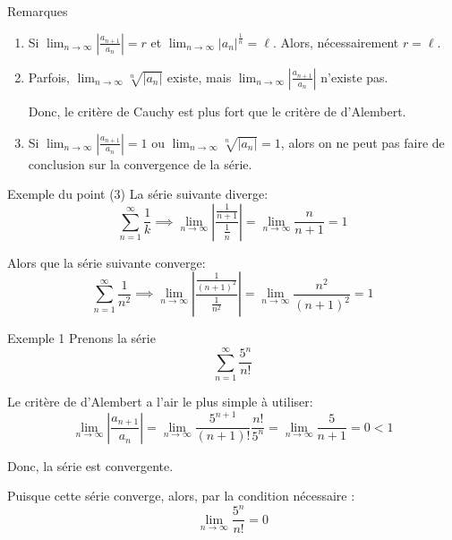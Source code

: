 \documentclass[a4paper]{article}
\begin{document}
\begin{parag}{Remarques}
    \begin{enumerate}[left=0pt]
        \item Si $\lim_{n \to \infty} \left|\frac{a_{n+1}}{a_n}\right| = r$ et $\lim_{n \to \infty} \left|a_n\right|^{\frac{1}{n}} = \ell$. Alors, nécessairement $ r = \ell$.
        \item Parfois, $\lim_{n \to \infty} \sqrt[n]{\left|a_n\right|}$ existe, mais $\lim_{n \to \infty} \left|\frac{a_{n+1}}{a_n}\right|$ n'existe pas.

            Donc, le critère de Cauchy est plus fort que le critère de d'Alembert.
        \item Si $\lim_{n \to \infty} \left|\frac{a_{n+1}}{a_n}\right| = 1$ ou $\lim_{n \to \infty} \sqrt[n]{\left|a_n\right|} = 1$, alors on ne peut pas faire de conclusion sur la convergence de la série.
    \end{enumerate}

    \begin{subparag}{Exemple du point (3)}
        La série suivante diverge:
        \[\sum_{n = 1}^{\infty} \frac{1}{k} \implies \lim_{n \to \infty} \left|\frac{\frac{1}{n+1}}{\frac{1}{n}}\right| = \lim_{n \to \infty} \frac{n}{n+1} = 1\]

        Alors que la série suivante converge:
        \[\sum_{n = 1}^{\infty} \frac{1}{n^2} \implies \lim_{n \to \infty} \left|\frac{\frac{1}{\left(n+1\right)^2}}{\frac{1}{n^2}}\right| = \lim_{n \to \infty} \frac{n^2}{\left(n+1\right)^2} = 1\]
    \end{subparag}
\end{parag}

\begin{parag}{Exemple 1}
    Prenons la série
    \[\sum_{n=1}^{\infty} \frac{5^{n}}{n!}\]

    Le critère de d'Alembert a l'air le plus simple à utiliser:
    \[\lim_{n \to \infty} \left|\frac{a_{n+1}}{a_n}\right| = \lim_{n \to \infty} \frac{5^{n+1}}{\left(n+1\right)!} \frac{n!}{5^{n}} = \lim_{n \to \infty} \frac{5}{n+1} = 0 < 1\]

    Donc, la série est convergente.

    Puisque cette série converge, alors, par la condition nécessaire :
    \[\lim_{n \to \infty} \frac{5^{n}}{n!} = 0\]
\end{parag}
\end{document}
